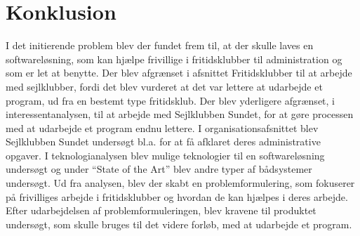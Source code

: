 \chapter{Konklusion}

\cbstart

I det initierende problem blev der fundet frem til, at der skulle laves en softwareløsning, som kan hjælpe frivillige i fritidsklubber til administration og som er let at benytte. 
Der blev afgrænset i afsnittet Fritidsklubber  til at arbejde med sejlklubber, fordi det blev vurderet at det var lettere at udarbejde et program, ud fra en bestemt type fritidsklub. Der blev yderligere afgrænset, i interessentanalysen, til at arbejde med Sejlklubben Sundet, for at gøre processen med at udarbejde et program endnu lettere.
I organisationsafsnittet blev Sejlklubben Sundet undersøgt bl.a. for at få afklaret deres administrative opgaver. 
I teknologianalysen blev mulige teknologier til en softwareløsning undersøgt og under ``State of the Art'' blev andre typer af bådsystemer undersøgt. 
Ud fra analysen, blev der skabt en problemformulering, som fokuserer på frivilliges arbejde i fritidsklubber og hvordan de kan hjælpes i deres arbejde.
Efter udarbejdelsen af problemformuleringen, blev kravene til produktet undersøgt, som skulle bruges til det videre forløb, med at udarbejde et program.


\cbend
